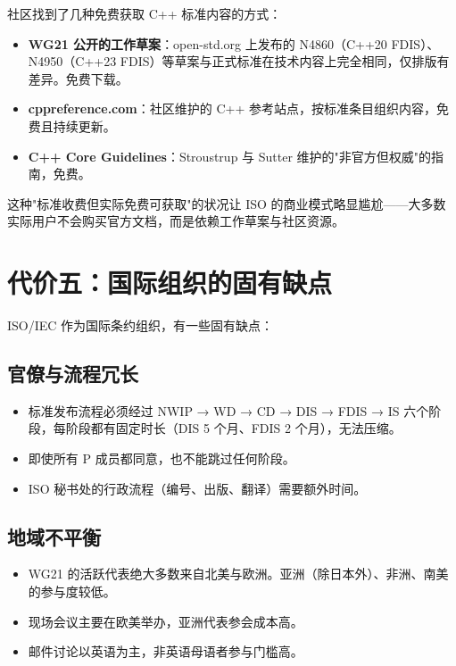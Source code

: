 \documentclass[12pt,a4paper,fontset=fandol]{ctexbook}
\begin{document}
社区找到了几种免费获取 C++ 标准内容的方式：

\begin{itemize}
  \item \textbf{WG21 公开的工作草案}：open-std.org 上发布的 N4860（C++20 FDIS）、N4950（C++23 FDIS）等草案与正式标准在技术内容上完全相同，仅排版有差异。免费下载。
  \item \textbf{cppreference.com}：社区维护的 C++ 参考站点，按标准条目组织内容，免费且持续更新。
  \item \textbf{C++ Core Guidelines}：Stroustrup 与 Sutter 维护的"非官方但权威"的指南，免费。
\end{itemize}

这种"标准收费但实际免费可获取"的状况让 ISO 的商业模式略显尴尬——大多数实际用户不会购买官方文档，而是依赖工作草案与社区资源。

\section{代价五：国际组织的固有缺点}

ISO/IEC 作为国际条约组织，有一些固有缺点：

\subsection{官僚与流程冗长}

\begin{itemize}
  \item 标准发布流程必须经过 NWIP → WD → CD → DIS → FDIS → IS 六个阶段，每阶段都有固定时长（DIS 5 个月、FDIS 2 个月），无法压缩。
  \item 即使所有 P 成员都同意，也不能跳过任何阶段。
  \item ISO 秘书处的行政流程（编号、出版、翻译）需要额外时间。
\end{itemize}

\subsection{地域不平衡}

\begin{itemize}
  \item WG21 的活跃代表绝大多数来自北美与欧洲。亚洲（除日本外）、非洲、南美的参与度较低。
  \item 现场会议主要在欧美举办，亚洲代表参会成本高。
  \item 邮件讨论以英语为主，非英语母语者参与门槛高。
\end{itemize}
\end{document}
